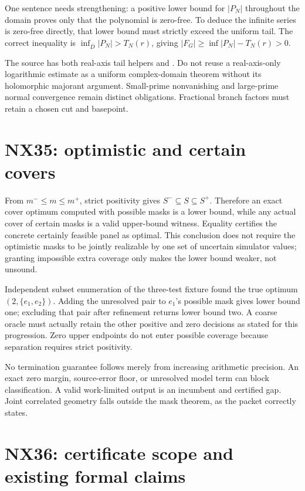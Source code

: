 \documentclass[
  11pt,
  a4paper,
]{report}
\let\nxtexttt\texttt
\renewcommand{\texttt}[1]{\nxtexttt{\seqsplit{#1}}}
\begin{document}
One sentence needs strengthening: a positive lower bound for \(|P_N|\)
throughout the domain proves only that the polynomial is zero-free. To
deduce the infinite series is zero-free directly, that lower bound must
strictly exceed the uniform tail. The correct inequality is
\(\inf_{\overline D}|P_N|>T_N(r)\), giving
\(|F_G|\ge\inf|P_N|-T_N(r)>0\).

The source has both real-axis tail helpers and
\texttt{arithmetic.complex\_disc\_certificate}. Do not reuse a
real-axis-only logarithmic estimate as a uniform complex-domain theorem
without its holomorphic majorant argument. Small-prime nonvanishing and
large-prime normal convergence remain distinct obligations. Fractional
branch factors must retain a chosen cut and basepoint.

\hypertarget{nx35-optimistic-and-certain-covers}{%
\section{NX35: optimistic and certain
covers}\label{nx35-optimistic-and-certain-covers}}

From \(m^-\le m\le m^+\), strict positivity gives
\(S^-\subseteq S\subseteq S^+\). Therefore an exact cover optimum
computed with possible masks is a lower bound, while any actual cover of
certain masks is a valid upper-bound witness. Equality certifies the
concrete certainly feasible panel as optimal. This conclusion does not
require the optimistic masks to be jointly realizable by one set of
uncertain simulator values; granting impossible extra coverage only
makes the lower bound weaker, not unsound.

Independent subset enumeration of the three-test fixture found the true
optimum \((2,\{e_1,e_2\})\). Adding the unresolved pair to \(e_1\)'s
possible mask gives lower bound one; excluding that pair after
refinement returns lower bound two. A coarse oracle must actually retain
the other positive and zero decisions as stated for this progression.
Zero upper endpoints do not enter possible coverage because separation
requires strict positivity.

No termination guarantee follows merely from increasing arithmetic
precision. An exact zero margin, source-error floor, or unresolved model
term can block classification. A valid work-limited output is an
incumbent and certified gap. Joint correlated geometry falls outside the
mask theorem, as the packet correctly states.

\hypertarget{nx36-certificate-scope-and-existing-formal-claims}{%
\section{NX36: certificate scope and existing formal
claims}\label{nx36-certificate-scope-and-existing-formal-claims}}
\end{document}
